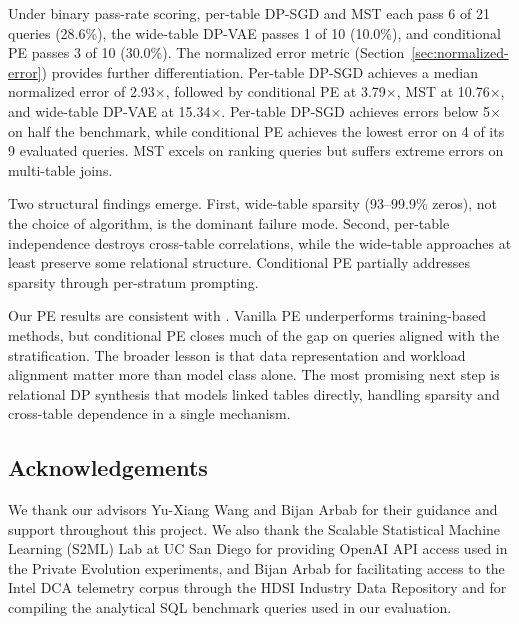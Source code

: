 \documentclass[12pt,letterpaper]{article}
\renewcommand{\_}{\textunderscore\allowbreak}
\begin{document}
Under binary pass-rate scoring, per-table DP-SGD and MST each pass 6 of 21 queries (28.6\%), the wide-table DP-VAE passes 1 of 10 (10.0\%), and conditional PE passes 3 of 10 (30.0\%). The normalized error metric (Section~\ref{sec:normalized-error}) provides further differentiation. Per-table DP-SGD achieves a median normalized error of 2.93$\times$, followed by conditional PE at 3.79$\times$, MST at 10.76$\times$, and wide-table DP-VAE at 15.34$\times$. Per-table DP-SGD achieves errors below 5$\times$ on half the benchmark, while conditional PE achieves the lowest error on 4 of its 9 evaluated queries. MST excels on ranking queries but suffers extreme errors on multi-table joins.

Two structural findings emerge. First, wide-table sparsity (93--99.9\% zeros), not the choice of algorithm, is the dominant failure mode. Second, per-table independence destroys cross-table correlations, while the wide-table approaches at least preserve some relational structure. Conditional PE partially addresses sparsity through per-stratum prompting.

Our PE results are consistent with \citet{swanberg2025apiaccessllmsuseful}. Vanilla PE underperforms training-based methods, but conditional PE closes much of the gap on queries aligned with the stratification. The broader lesson is that data representation and workload alignment matter more than model class alone. The most promising next step is relational DP synthesis that models linked tables directly, handling sparsity and cross-table dependence in a single mechanism.

\subsection{Acknowledgements}

We thank our advisors Yu-Xiang Wang and Bijan Arbab for their guidance and support throughout this project. We also thank the Scalable Statistical Machine Learning (S2ML) Lab at UC San Diego for providing OpenAI API access used in the Private Evolution experiments, and Bijan Arbab for facilitating access to the Intel DCA telemetry corpus through the HDSI Industry Data Repository and for compiling the analytical SQL benchmark queries used in our evaluation.

\newpage

\makereference

\nocite{*}


\end{document}
